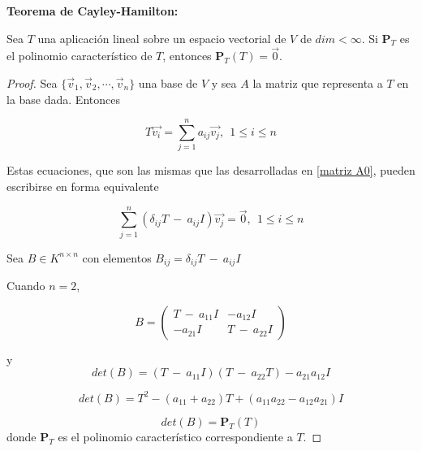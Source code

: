 \begin{corollary} \textbf{ Teorema de Cayley-Hamilton:}

\label{TeoremaCH}








Sea $T$ una aplicación lineal sobre un espacio vectorial de $V$ de $dim<\infty$. 
Si $\mathbf{P}_T $ es el polinomio característico de $T$, entonces $\mathbf{P}_T(T) =\vec{0}$. 



\bigskip

\begin{proof}


Sea  $\{ \vec{v}_1,\vec{v}_2,\cdots, \vec{v}_n\}$ una base de $V$ y sea $A$ la matriz que representa a $T$ en la base dada. Entonces


\bigskip

$$T \vec{v_i}=\sum^{n}_{j=1}a_{ij}\vec{v_j},~~1\leq i \leq n $$

\bigskip

Estas ecuaciones, que son las mismas que las desarrolladas en  \ref{matriz A0}, pueden escribirse en forma equivalente





$$\sum^{n}_{j=1}( \delta_{ij}T ~-~  a_{ij}I   )\vec{v_j}=\vec{0},~~1\leq i \leq n $$

\bigskip

Sea  $B\in K^{n \times  n}$ con elementos $B_{ij}= \delta_{ij}T  ~-~   a_{ij}I      $


\bigskip

Cuando $n=2$,
 
$$B=\left(\begin{array}{cc} T  ~-~  a_{11}I  &  -a_{12} I \\ - a_{21} I & T ~-~   a_{22} I
\end{array}
 \right)$$

\bigskip
y 
$$det(B)=(T ~-~   a_{11}I)( T  ~-~ a_{22} T   )-a_{21}a_{12}I$$

\bigskip

$$ det(B)= T^{2}-(a_{11}+a_{22})T+  ( a_{11}a_{22}      -a_{12}a_{21})I$$

\bigskip

$$det(B)=\mathbf{P}_T(T)$$
\noindent
donde $\mathbf{P}_T$ es el polinomio característico correspondiente a $T$.





\end{proof}
\end{corollary}
